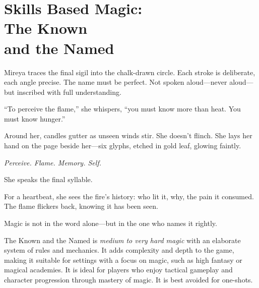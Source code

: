 \newcolumn
\section[Skills Based Magic: The Known and the Named]{Skills Based Magic:\\ The Known\\ and the Named}

\begin{Example}{}
    Mireya traces the final sigil into the chalk-drawn circle. Each stroke is deliberate, each angle precise. The name must be perfect. Not spoken aloud—never aloud—but inscribed with full understanding.

    “To perceive the flame,” she whispers, “you must know more than heat. You must know hunger.”

    Around her, candles gutter as unseen winds stir. She doesn’t flinch. She lays her hand on the page beside her—six glyphs, etched in gold leaf, glowing faintly.

    \textit{Perceive. Flame. Memory. Self.} 

    She speaks the final syllable.

    For a heartbeat, she sees the fire’s history: who lit it, why, the pain it consumed. The flame flickers back, knowing it has been seen.

    Magic is not in the word alone—but in the one who names it rightly.
\end{Example}

The Known and the Named is \emph{medium to very hard magic} with an elaborate system of rules and mechanics. It adds complexity and depth to the game, making it suitable for settings with a focus on magic, such as high fantasy or magical academies. It is ideal for players who enjoy tactical gameplay and character progression through mastery of magic. It is best avoided for one-shots.
